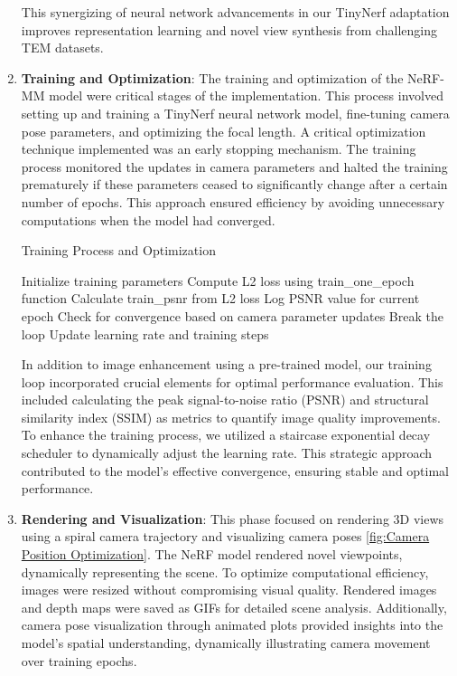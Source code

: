 \begin{enumerate}
    This synergizing of neural network advancements in our TinyNerf adaptation improves representation learning and novel view synthesis from challenging TEM datasets.


    \item \textbf{Training and Optimization}: The training and optimization of the NeRF-MM model were critical stages of the implementation. This process involved setting up and training a TinyNerf neural network model, fine-tuning camera pose parameters, and optimizing the focal length. A critical optimization technique implemented was an early stopping mechanism. The training process monitored the updates in camera parameters and halted the training prematurely if these parameters ceased to significantly change after a certain number of epochs. This approach ensured efficiency by avoiding unnecessary computations when the model had converged.


    \begin{algorithm}
    \caption{Training Process and Optimization}
    \begin{algorithmic}[1]
    \STATE Initialize training parameters
        \STATE Compute L2 loss using train\_one\_epoch function
        \STATE Calculate train\_psnr from L2 loss
        \STATE Log PSNR value for current epoch
        \STATE Check for convergence based on camera parameter updates
            \STATE Break the loop
        \ENDIF
        \STATE Update learning rate and training steps
    \ENDFOR
    \end{algorithmic}
    \end{algorithm}

    
    In addition to image enhancement using a pre-trained model, our training loop incorporated crucial elements for optimal performance evaluation. This included calculating the peak signal-to-noise ratio (PSNR) and structural similarity index (SSIM) as metrics to quantify image quality improvements. To enhance the training process, we utilized a staircase exponential decay scheduler to dynamically adjust the learning rate. This strategic approach contributed to the model's effective convergence, ensuring stable and optimal performance.

    \vspace{10pt}
    
    \item \textbf{Rendering and Visualization}: This phase focused on rendering 3D views using a spiral camera trajectory and visualizing camera poses \ref{fig:Camera Position Optimization}. The NeRF model rendered novel viewpoints, dynamically representing the scene. To optimize computational efficiency, images were resized without compromising visual quality. Rendered images and depth maps were saved as GIFs for detailed scene analysis. Additionally, camera pose visualization through animated plots provided insights into the model's spatial understanding, dynamically illustrating camera movement over training epochs.



\end{enumerate}
